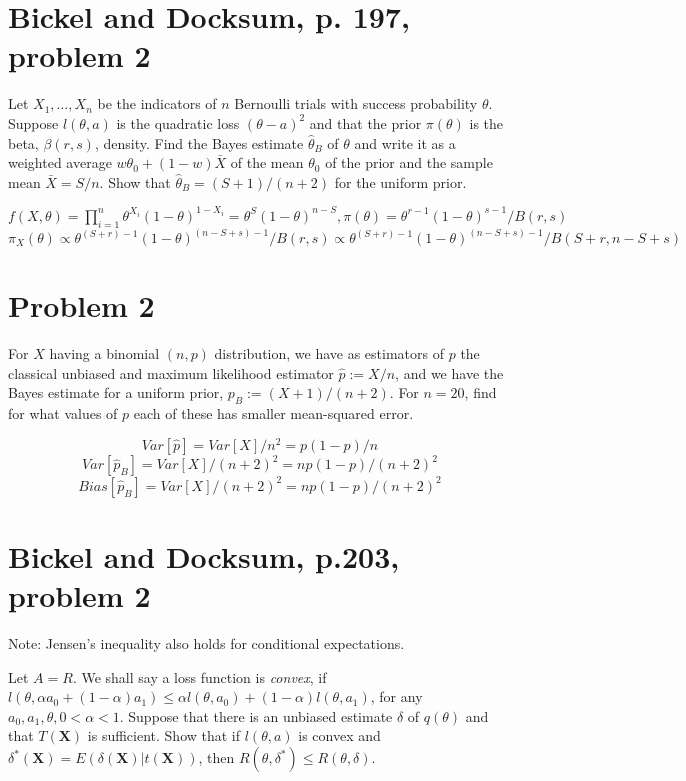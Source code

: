 \documentclass[11pt]{article}
\newcommand{\ProbS}{\iftrue}
\newcommand{\ProbE}{\fi}
\begin{document}
\section{Bickel and Docksum, p. 197, problem 2}
\ProbS
Let $X_1, \dots, X_n$ be the indicators of $n$ Bernoulli trials with success probability $\theta$. Suppose $l(\theta, a)$ is the quadratic loss $(\theta-a)^2$ and that the prior $\pi(\theta)$ is the beta,
$\beta(r, s)$, density. Find the Bayes estimate $\hat{\theta}_B$ of
$\theta$ and write it as a weighted average $w\theta_0 + (1-w)\bar{X}$ of the mean $\theta_0$ of the prior and the sample mean $\bar{X} = S/n$. Show that $\hat{\theta}_B = (S+1)/(n+2)$ for the uniform prior.
\ProbE

$
f(X, \theta) = \prod_{i=1}^{n} \theta^{X_i} (1-\theta)^{1-X_i}
= \theta^{S} (1-\theta)^{n-S},
\pi(\theta) = \theta^{r-1} (1-\theta)^{s-1} / B(r,s)
$
\\
$
\pi_X(\theta) \propto
{\theta^{(S+r)-1}(1-\theta)^{(n-S+s)-1}} / {B(r, s)} \propto
{\theta^{(S+r)-1}(1-\theta)^{(n-S+s)-1}} / {B(S+r, n-S+s)}
$

\section{Problem 2}
\ProbS
For $X$ having a binomial $(n,p)$ distribution, we have as estimators of $p$ the classical unbiased and maximum likelihood estimator
$
\hat{p} := X/n
$, and we have the Bayes estimate for a uniform prior,
$
p_B := (X+1)/(n+2)
$. For $n=20$, find for what values of $p$ each of these has smaller mean-squared error.
\ProbE

$$
Var[\hat{p}] = Var[X] / n^2 = p(1-p)/n
$$
$$
Var[\hat{p}_B] = Var[X] / (n+2)^2 = np(1-p)/(n+2)^2
$$
$$
Bias[\hat{p}_B] = Var[X] / (n+2)^2 = np(1-p)/(n+2)^2
$$
\section{Bickel and Docksum, p.203, problem 2}
\ProbS
Note: Jensen's inequality also holds for conditional expectations.

Let $A=R$. We shall say a loss function is \emph{convex}, if
$l(\theta, \alpha a_0 + (1-\alpha)a_1) \leq
\alpha l(\theta, a_0) + (1-\alpha)l(\theta, a_1)$,
for any $a_0, a_1, \theta, 0<\alpha<1$.
Suppose that there is an unbiased estimate $\delta$ of $q(\theta)$
and that $T(\mathbf{X})$ is sufficient.
Show that if $l(\theta, a)$ is convex and
$\delta^{*}(\mathbf{X}) = E(\delta(\mathbf{X}) | t(\mathbf{X}))$,
then $R(\theta, \delta^{*}) \leq R(\theta, \delta)$.
\end{document}
